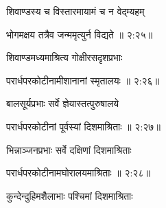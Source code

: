 {\devanagarifont शिवाण्डस्य च विस्तारमायामं च न वेद्म्यहम् \thinspace{\dandab} \dontdisplaylinenum }%
 

{\devanagarifont भोगमक्षय तत्रैव जन्ममृत्युर्न विद्यते {॥ २:२५॥} \veg\dontdisplaylinenum }%

{\devanagarifont शिवाण्डमध्यमाश्रित्य गोक्षीरसदृशप्रभाः \thinspace{\dandab} \dontdisplaylinenum }%


{\devanagarifont परार्धपरकोटीनामीशानानां स्मृतालयः {॥ २:२६॥} \veg\dontdisplaylinenum }%

{\devanagarifont बालसूर्यप्रभाः सर्वे ज्ञेयास्तत्पुरुषालये \thinspace{\dandab} \dontdisplaylinenum }%


{\devanagarifont परार्धपरकोटीनां पूर्वस्यां दिशमाश्रिताः {॥ २:२७॥} \veg\dontdisplaylinenum }%

{\devanagarifont भिन्नाञ्जनप्रभाः सर्वे दक्षिणां दिशमाश्रिताः \thinspace{\dandab} \dontdisplaylinenum }%


{\devanagarifont परार्धपरकोटीनामघोरालयमाश्रिताः {॥ २:२८॥} \veg\dontdisplaylinenum }%

{\devanagarifont कुन्देन्दुहिमशैलाभाः पश्चिमां दिशमाश्रिताः \thinspace{\dandab} \dontdisplaylinenum }%


